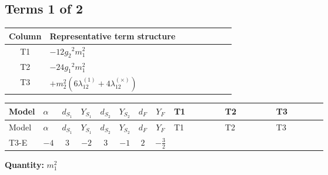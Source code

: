 \documentclass[8pt]{article}
\begin{document}
\begin{landscape}
\subsection*{Terms 1 of 2}
\begin{center}
\begin{tabular}{@{}c >{\raggedright\arraybackslash}p{0.82\linewidth}@{}}
\toprule
Column & Representative term structure \\
\midrule
T1 & \(\displaystyle -12 {g_2}^2 {m_1^2}\) \\
\midrule
T2 & \(\displaystyle -24 {g_1}^2 {m_1^2}\) \\
\midrule
T3 & \(\displaystyle +{m_2^2} (6 {\lambda_{12}^{(1)}}+4 {\lambda_{12}^{(\times)}})\) \\
\midrule
\bottomrule
\end{tabular}
\end{center}
\smallskip
\tiny
\begin{longtable}{@{}llcccccc >{\raggedright\arraybackslash}p{0.21\linewidth} >{\raggedright\arraybackslash}p{0.21\linewidth} >{\raggedright\arraybackslash}p{0.21\linewidth}@{}}
\toprule
Model & $\alpha$ & $d_{S_1}$ & $Y_{S_1}$ & $d_{S_2}$ & $Y_{S_2}$ & $d_F$ & $Y_F$ & T1 & T2 & T3 \\
\midrule
\endfirsthead
\toprule
Model & $\alpha$ & $d_{S_1}$ & $Y_{S_1}$ & $d_{S_2}$ & $Y_{S_2}$ & $d_F$ & $Y_F$ & T1 & T2 & T3 \\
\midrule
\endhead
T3-E & $-4$ & $3$ & $-2$ & $3$ & $-1$ & $2$ & $-\frac{3}{2}$ & \scriptsize\adjustbox{max width=\linewidth}{$\begin{gathered} -12 {g_2}^2 {m_1^2}\end{gathered}$} & \scriptsize\adjustbox{max width=\linewidth}{$\begin{gathered} -24 {g_1}^2 {m_1^2}\end{gathered}$} & \scriptsize\adjustbox{max width=\linewidth}{$\begin{gathered} +{m_2^2} (6 {\lambda_{12}^{(1)}}+4 {\lambda_{12}^{(\times)}})\end{gathered}$} \\
\midrule
\bottomrule
\end{longtable}
\clearpage
\noindent\textbf{Quantity: }$m_1^2$\par\smallskip

\end{landscape}
\end{document}
